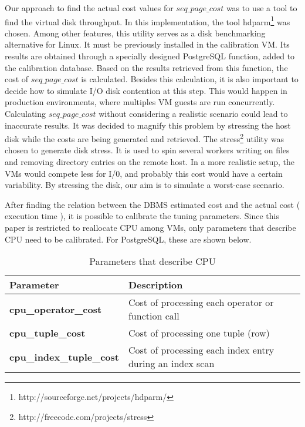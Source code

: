 Our approach to find the actual cost values for $seq\_page\_cost$ was to use a tool to find the virtual disk throughput. In this implementation, the tool hdparm\footnote{http://sourceforge.net/projects/hdparm/} was chosen. Among other features, this utility serves as a disk benchmarking alternative for Linux. It must be previously installed in the calibration VM. Its results are obtained through a specially designed PostgreSQL function, added to the calibration database. Based on the results retrieved from this function, the cost of $seq\_page\_cost$ is calculated. Besides this calculation, it is also important to decide how to simulate I/O disk contention at this step. This would happen in production environments, where multiples VM guests are run concurrently. Calculating $seq\_page\_cost$ without considering a realistic scenario could lead to inaccurate results. It was decided to magnify this problem by stressing the host disk while the costs are being generated and retrieved. The stress\footnote{
http://freecode.com/projects/stress} utility was chosen to generate disk stress. It is used to spin several 
workers writing on files and removing directory entries on the remote host. In a more realistic setup, the VMs would compete less for I/0, and probably this cost would have a certain variability. By stressing the disk, our aim is to simulate a worst-case scenario. 


After finding the relation between the DBMS estimated cost and the actual cost ( execution time ), it is possible to calibrate the tuning parameters. Since this paper is restricted to reallocate CPU among VMs, only parameters that describe CPU need to be calibrated. For PostgreSQL, these are shown below.

\begin{table}[ht]
    \centering
    \begin{tabular}{ | l | p{5cm} |}
    \hline
    Parameter & Description  \\ \hline
    \textbf{cpu\_operator\_cost} & Cost of processing each operator or function call \\ \hline
    \textbf{cpu\_tuple\_cost} & Cost of processing one tuple (row) \\ \hline
    \textbf{cpu\_index\_tuple\_cost} & Cost of processing each index entry during an index scan  \\
    \hline
    \end{tabular}
    \caption{Parameters that describe CPU}
    \label{table:descriptive}
\end{table}


